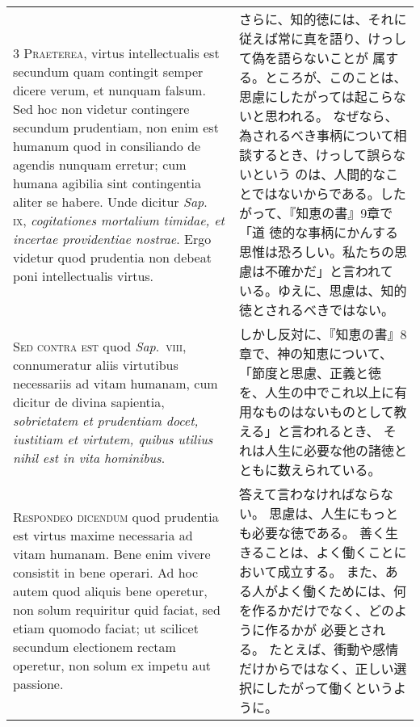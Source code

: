 \documentclass[10pt]{jsarticle} %
\begin{document}
\begin{longtable}{p{21em}p{21em}}
\\



{\scshape 3 Praeterea}, virtus intellectualis est secundum quam
 contingit semper dicere verum, et nunquam falsum. Sed hoc non videtur
 contingere secundum prudentiam, non enim est humanum quod in
 consiliando de agendis nunquam erretur; cum humana agibilia sint
 contingentia aliter se habere. Unde dicitur {\itshape Sap}.~{\scshape
 ix}, {\itshape cogitationes mortalium timidae, et incertae providentiae
 nostrae}. Ergo videtur quod prudentia non debeat poni intellectualis
 virtus.

&

さらに、知的徳には、それに従えば常に真を語り、けっして偽を語らないことが
 属する。ところが、このことは、思慮にしたがっては起こらないと思われる。
 なぜなら、為されるべき事柄について相談するとき、けっして誤らないという
 のは、人間的なことではないからである。したがって、『知恵の書』9章で「道
 徳的な事柄にかんする思惟は恐ろしい。私たちの思慮は不確かだ」と言われて
 いる。ゆえに、思慮は、知的徳とされるべきではない。

\\



{\scshape Sed contra est} quod {\itshape Sap}.~{\scshape viii},
 connumeratur aliis virtutibus necessariis ad vitam humanam, cum dicitur
 de divina sapientia, {\itshape sobrietatem et prudentiam docet, iustitiam et
 virtutem, quibus utilius nihil est in vita hominibus}.


&

しかし反対に、『知恵の書』8章で、神の知恵について、「節度と思慮、正義と徳
 を、人生の中でこれ以上に有用なものはないものとして教える」と言われるとき、
 それは人生に必要な他の諸徳とともに数えられている。


\\



{\scshape Respondeo dicendum} quod prudentia est
 virtus maxime necessaria ad vitam humanam. Bene enim vivere consistit
 in bene operari. Ad hoc autem quod aliquis bene operetur, non solum
 requiritur quid faciat, sed etiam quomodo faciat; ut scilicet secundum
 electionem rectam operetur, non solum ex impetu aut passione. 

&
答えて言わなければならない。
思慮は、人生にもっとも必要な徳である。
善く生きることは、よく働くことにおいて成立する。
また、ある人がよく働くためには、何を作るかだけでなく、どのように作るかが
 必要とされる。
たとえば、衝動や感情だけからではなく、正しい選択にしたがって働くというよ
 うに。



\end{longtable}
\end{document}
